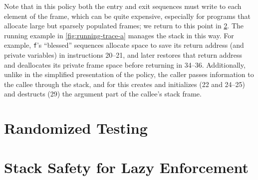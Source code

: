 \documentclass[acmsmall,review,anonymous]{acmart}\settopmatter{printfolios=true,printccs=false,printacmref=false}
\begin{document}
Note that in this policy both the entry and exit sequences
must write to each element of
the frame, which can be quite expensive, especially for programs that
allocate large but sparsely populated frames; we return to this point
in \cref{sec:lazy}.
%
The running example in \cref{fig:running-trace-a} manages the stack in this way.
For example, {\tt f}'s ``blessed'' sequences allocate space to save its return
address (and private variables) in instructions 20--21, and later restores that
return address and deallocates its private frame space before returning in
34--36. Additionally, unlike in the simplified presentation of the policy, the
caller passes information to the callee through the stack, and for this creates
and initializes (22 and 24--25) and destructs (29) the argument part of the
callee's stack frame.
%



\section{Randomized Testing}
\label{sec:testing}

\section{Stack Safety for Lazy Enforcement}
\label{sec:lazy}
\end{document}
